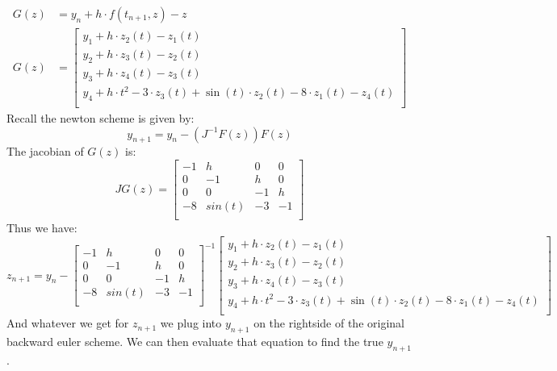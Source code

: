 \documentclass{article}
\begin{document}
\begin{enumerate}
\begin{align*}
G(z) &=  y_n + h \cdot f(t_{n+1}, z) - z \\
G(z) &= \begin{bmatrix}
y_1 + h \cdot z_2(t) - z_1(t) \\
y_2 + h \cdot z_3(t) - z_2(t) \\
y_3 + h \cdot z_4(t) - z_3(t) \\
y_4 + h \cdot t^2 - 3 \cdot z_3(t) + \sin (t) \cdot z_2(t) - 8 \cdot z_1(t) - z_4(t) \\
\end{bmatrix}
\end{align*}
Recall the newton scheme is given by: \\
\[
y_{n+1} = y_n - (J^{-1}F(z))F(z)
\]
The jacobian of $G(z)$ is:\\
\[
JG(z) = \begin{bmatrix}
-1 & h & 0 & 0 \\
0 & -1 & h & 0 \\
0 & 0 & -1 & h \\
-8 & sin(t) & -3 & -1 \\
\end{bmatrix}
\]
Thus we have: \\
\[
z_{n+1} = y_n - \begin{bmatrix}
-1 & h & 0 & 0 \\
0 & -1 & h & 0 \\
0 & 0 & -1 & h \\
-8 & sin(t) & -3 & -1 \\
\end{bmatrix}^{-1}
\begin{bmatrix}
y_1 + h \cdot z_2(t) - z_1(t) \\
y_2 + h \cdot z_3(t) - z_2(t) \\
y_3 + h \cdot z_4(t) - z_3(t) \\
y_4 + h \cdot t^2 - 3 \cdot z_3(t) + \sin (t) \cdot z_2(t) - 8 \cdot z_1(t) - z_4(t) \\
\end{bmatrix}
\]
And whatever we get for $z_{n+1}$ we plug into $y_{n+1}$ on the rightside of the original backward euler scheme. We can then evaluate that equation to find the true $y_{n+1}$.
\end{enumerate}
\end{document}
